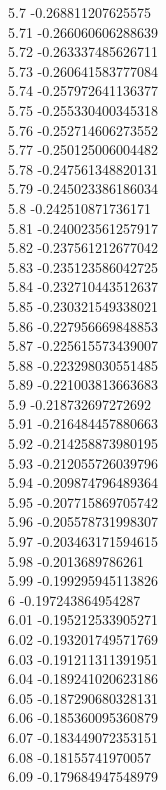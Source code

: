 {5.7	-0.268811207625575\\
5.71	-0.266060606288639\\
5.72	-0.263337485626711\\
5.73	-0.260641583777084\\
5.74	-0.257972641136377\\
5.75	-0.255330400345318\\
5.76	-0.252714606273552\\
5.77	-0.250125006004482\\
5.78	-0.247561348820131\\
5.79	-0.245023386186034\\
5.8	-0.242510871736171\\
5.81	-0.240023561257917\\
5.82	-0.237561212677042\\
5.83	-0.235123586042725\\
5.84	-0.232710443512637\\
5.85	-0.230321549338021\\
5.86	-0.227956669848853\\
5.87	-0.225615573439007\\
5.88	-0.223298030551485\\
5.89	-0.221003813663683\\
5.9	-0.218732697272692\\
5.91	-0.216484457880663\\
5.92	-0.214258873980195\\
5.93	-0.212055726039796\\
5.94	-0.209874796489364\\
5.95	-0.207715869705742\\
5.96	-0.205578731998307\\
5.97	-0.203463171594615\\
5.98	-0.2013689786261\\
5.99	-0.199295945113826\\
6	-0.197243864954287\\
6.01	-0.195212533905271\\
6.02	-0.193201749571769\\
6.03	-0.191211311391951\\
6.04	-0.189241020623186\\
6.05	-0.187290680328131\\
6.06	-0.185360095360879\\
6.07	-0.183449072353151\\
6.08	-0.18155741970057\\
6.09	-0.179684947548979\\
}
